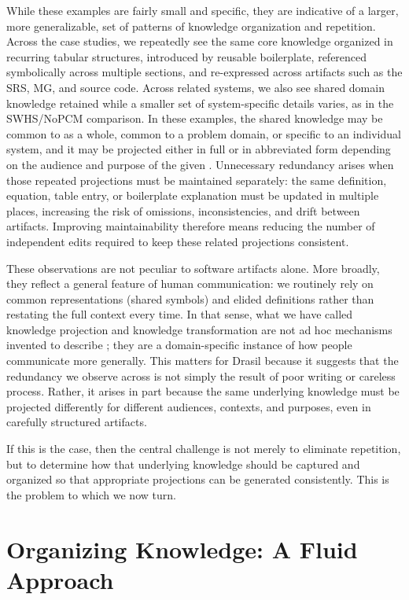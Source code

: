 While these examples are fairly small and specific, they are indicative of 
a larger, more generalizable, set of patterns of knowledge organization and 
repetition. Across the case studies, we repeatedly see the same core knowledge 
organized in recurring tabular structures, introduced by reusable boilerplate, 
referenced symbolically across multiple sections, and re-expressed across 
artifacts such as the SRS, MG, and source code. Across related systems, we 
also see shared domain knowledge retained while a smaller set of 
system-specific details varies, as in the SWHS/NoPCM comparison. In these 
examples, the shared knowledge may be common to \sfs{} as a whole, common to a 
problem domain, or specific to an individual system, and it may be projected 
either in full or in abbreviated form depending on the audience and purpose of 
the given \sf{}. Unnecessary redundancy arises when those repeated projections 
must be maintained separately: the same definition, equation, table entry, or 
boilerplate explanation must be updated in multiple places, increasing the 
risk of omissions, inconsistencies, and drift between artifacts. Improving 
maintainability therefore means reducing the number of independent edits 
required to keep these related projections consistent.

These observations are not peculiar to software artifacts alone. More broadly, 
they reflect a general feature of human communication: we routinely rely on 
common representations (shared symbols) and elided definitions rather than 
restating the full context every time. In that sense, what we have called 
knowledge projection and knowledge transformation are not ad hoc mechanisms 
invented to describe \sfs{}; they are a domain-specific instance of how people 
communicate more generally. This matters for Drasil because it suggests that 
the redundancy we observe across \sfs{} is not simply the result of poor 
writing or careless process. Rather, it arises in part because the same 
underlying knowledge must be projected differently for different audiences, 
contexts, and purposes, even in carefully structured artifacts.

If this is the case, then the central challenge is not merely to eliminate 
repetition, but to determine how that underlying knowledge should be captured 
and organized so that appropriate projections can be generated consistently. 
This is the problem to which we now turn.

\section{Organizing Knowledge: A Fluid Approach}

